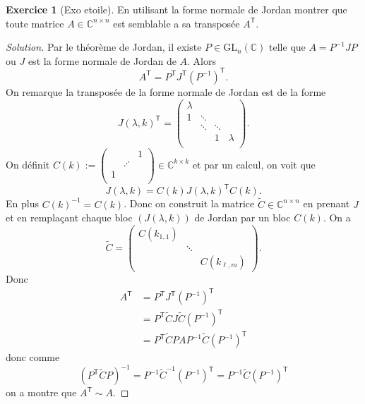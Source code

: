 \documentclass[a4paper,12pt,french]{report}
\theoremstyle{plain}
\theoremstyle{definition}
\newtheorem{exercise}{Exercice}[chapter]
\begin{document}
\begin{exercise}[Exo etoile]
En utilisant la forme normale de Jordan montrer que toute matrice $A\in \mathbb{C}^{n\times n}$ est semblable a sa transposée $A^{\mathsf{T}}$.
\end{exercise}
\begin{proof}[Solution]
Par le théorème de Jordan, il existe $P\in \mathrm{GL}_{n}(\mathbb{C})$ telle que $A=P^{-1}JP$ ou $J$ est la forme normale de Jordan de $A$. Alors 
$$
A^{\mathsf{T}}=P^{\mathsf{T}}J^{\mathsf{T}}(P^{-1})^{\mathsf{T}}.
$$
On remarque la transposée de la forme normale de Jordan est de la forme
$$
J(\lambda,k)^{\mathsf{T}}=\begin{pmatrix}
\lambda \\
1 & \ddots \\
 & \ddots  & \ddots\\
 &  & 1 & \lambda \\
\end{pmatrix}.
$$
On définit $C(k):=\begin{pmatrix} &  & 1 \\  & \iddots \\ 1 \\ \end{pmatrix}\in \mathbb{C}^{k\times k}$ et par un calcul, on voit que
$$
J(\lambda,k)=C(k)J(\lambda,k)^{\mathsf{T}}C(k).
$$
En plus $C(k)^{-1}=C(k)$. Donc on construit la matrice $\tilde{C}\in \mathbb{C}^{n\times n}$ en prenant $J$ et en remplaçant chaque bloc $(J(\lambda,k))$ de Jordan par un bloc $C(k)$. On a
$$
\tilde{C}=\begin{pmatrix}
C(k_{1,1}) \\
 & \ddots \\
 &  & C(k_{\ell,m})
\end{pmatrix}.
$$
Donc 
\begin{align*}
A^{\mathsf{T}} & =P^{\mathsf{T}}J^{\mathsf{T}}(P^{-1})^{\mathsf{T}} \\
 & =P^{\mathsf{T}}\tilde{C}J\tilde{C}(P^{-1})^{\mathsf{T}} \\
 & =P^{\mathsf{T}}\tilde{C}PAP^{-1}\tilde{C}(P^{-1})^{\mathsf{T}}
\end{align*}
donc comme
$$
(P^{\mathsf{T}}\tilde{C}P)^{-1}=P^{-1}\tilde{C}^{-1}(P^{-1})^{\mathsf{T}}=P^{-1}\tilde{C}(P^{-1})^{\mathsf{T}}
$$
on a montre que $A^{\mathsf{T}}\sim A$. 
\end{proof}
\end{document}
